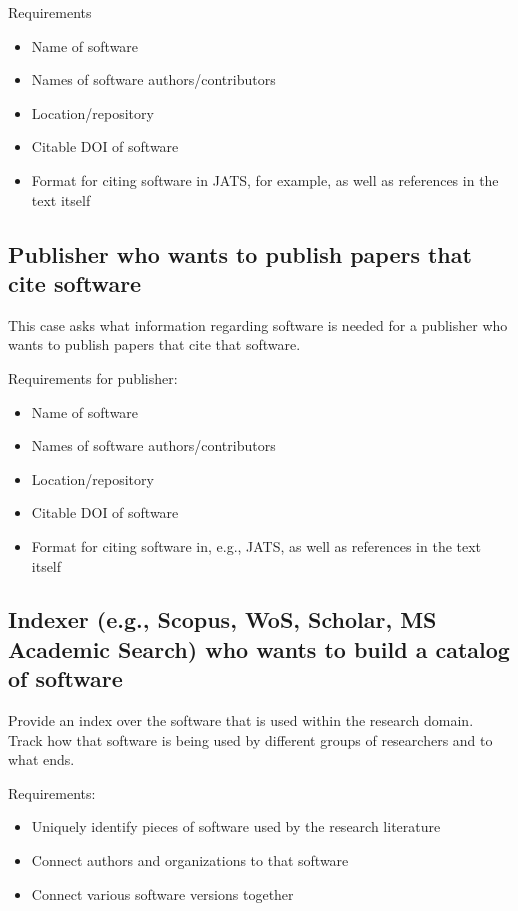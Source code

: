 \documentclass[12pt, oneside]{amsart}
\begin{document}
Requirements
\begin{itemize}
\item Name of software
\item Names of software authors/contributors
\item Location/repository
\item Citable DOI of software
\item Format for citing software in JATS, for example, as well as references in the text itself
\end{itemize}

\subsection{Publisher who wants to publish papers that cite software}

This case asks what information regarding software is needed for a publisher who wants to publish papers that cite that software.

Requirements for publisher:
\begin{itemize}
\item Name of software
\item Names of software authors/contributors
\item Location/repository
\item Citable DOI of software
\item Format for citing software in, e.g., JATS, as well as references in the text itself
\end{itemize}

\subsection{Indexer (e.g., Scopus, WoS, Scholar, MS Academic Search) who wants to build a catalog of software}

Provide an index over the software that is used within the research domain. Track how that software is being used by different groups of researchers and to what ends.

Requirements:
\begin{itemize}
\item Uniquely identify pieces of software used by the research literature
\item Connect authors and organizations to that software
\item Connect various software versions together
\end{itemize}
\end{document}
